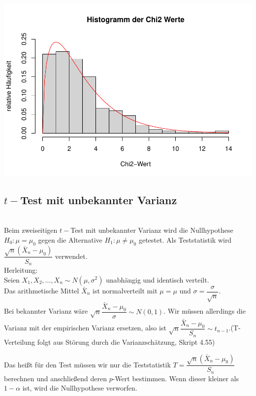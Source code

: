 \documentclass[]{article}
\begin{document}
\includegraphics{Test_files/figure-latex/unnamed-chunk-3-1.pdf}

\hypertarget{t-test-mit-unbekannter-varianz}{%
\subsection{\texorpdfstring{\(t-\)Test mit unbekannter Varianz}{t-Test mit unbekannter Varianz}}\label{t-test-mit-unbekannter-varianz}}

\citep{wikipediaT}\\
Beim zweiseitigen \(t-\)Test mit unbekannter Varianz wird die Nullhypothese \(H_0: \mu = \mu_0\) gegen die Alternative \(H_1: \mu \neq \mu_0\) getestet.
Als Teststatistik wird \(\dfrac{\sqrt{n}(\bar X_n-\mu_0)}{S_n}\) verwendet.\\
Herleitung:\\
Seien \(X_1, X_2, \dots, X_n\sim N(\mu, \sigma^2)\) unabhängig und identisch verteilt.\\
Das arithmetische Mittel \(\bar X_n\) ist normalverteilt mit \(\mu = \mu\) und \(\sigma = \dfrac{\sigma}{\sqrt{n}}\).\\
Bei bekannter Varianz wäre \(\sqrt{n}\dfrac{\bar X_n-\mu_0}{\sigma}\sim N(0,1)\).
Wir müssen allerdings die Varianz mit der empirischen Varianz ersetzen, also ist \(\sqrt{n}\dfrac{\bar X_n-\mu_0}{S_n}\sim t_{n-1}\).(T-Verteilung folgt aus Störung durch die Varianzschätzung, Skript 4.55)

Das heißt für den Test müssen wir nur die Teststatistik \(T=\dfrac{\sqrt{n}(\bar X_n-\mu_0)}{S_n}\) berechnen und anschließend deren \(p\)-Wert bestimmen. Wenn dieser kleiner als \(1-\alpha\) ist,
wird die Nullhypothese verworfen.
\end{document}
